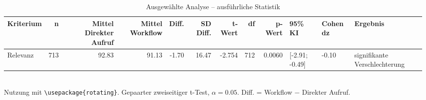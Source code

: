 \begin{table}
\centering
\caption{Ausgewählte Analyse -- ausführliche Statistik}
\begin{tabular}{lrrrrrrrrlll}
\toprule
Kriterium & n & Mittel Direkter Aufruf & Mittel Workflow & Diff. & SD Diff. & t-Wert & df & p-Wert & 95\% KI & Cohen dz & Ergebnis \\
\midrule
Relevanz & 713 & 92.83 & 91.13 & -1.70 & 16.47 & -2.754 & 712 & 0.0060 & [-2.91; -0.49] & -0.10 & signifikante Verschlechterung \\
\bottomrule
\end{tabular}
\\[2mm]
\footnotesize Nutzung mit \texttt{\textbackslash usepackage\{rotating\}}. Gepaarter zweiseitiger t-Test, $\alpha=0.05$. Diff. = Workflow $-$ Direkter Aufruf.
\end{table}
